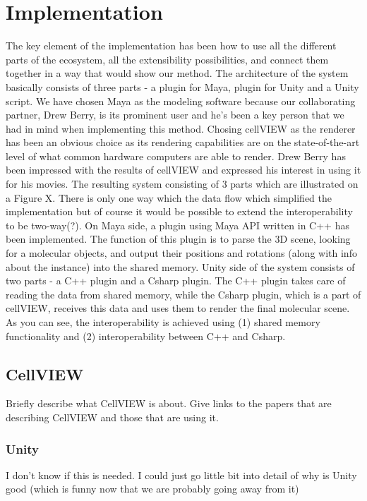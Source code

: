 \documentclass[
  digital, %
  table,   %
  lof,     %
  lot,     %
]{fithesis3}
\begin{document}
\chapter{Implementation}
The key element of the implementation has been how to use all the different parts of the ecosystem, all the extensibility possibilities, and connect them together in a way that would show our method. The architecture of the system basically consists of three parts - a plugin for Maya, plugin for Unity and a Unity script.
We have chosen Maya as the modeling software because our collaborating partner, Drew Berry, is its prominent user and he's been a key person that we had in mind when implementing this method. Chosing cellVIEW as the renderer has been an obvious choice as its rendering capabilities are on the state-of-the-art level of what common hardware computers are able to render. Drew Berry has been impressed with the results of cellVIEW and expressed his interest in using it for his movies.
The resulting system consisting of 3 parts which are illustrated on a Figure X. There is only one way which the data flow which simplified the implementation but of course it would be possible to extend the interoperability to be two-way(?).
On Maya side, a plugin using Maya API written in C++ has been implemented. The function of this plugin is to parse the 3D scene, looking for a molecular objects, and output their positions and rotations (along with info about the instance) into the shared memory.
Unity side of the system consists of two parts - a C++ plugin and a Csharp plugin. The C++ plugin takes care of reading the data from shared memory, while the Csharp plugin, which is a part of cellVIEW, receives this data and uses them to render the final molecular scene. As you can see, the interoperability is achieved using (1) shared memory functionality and (2) interoperability between C++ and Csharp.

\section{CellVIEW}
Briefly describe what CellVIEW is about. Give links to the papers that are describing CellVIEW and those that are using it.
\subsection{Unity}
I don't know if this is needed. I could just go little bit into detail of why is Unity good (which is funny now that we are probably going away from it)
\end{document}
